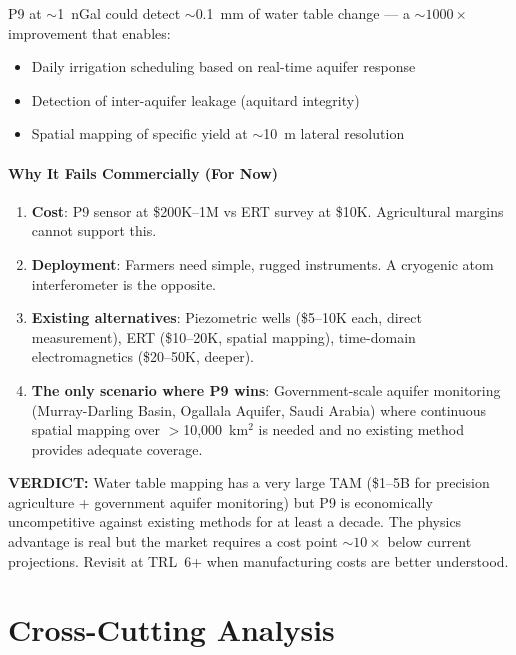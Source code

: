 \documentclass[11pt]{article}
\theoremstyle{definition}
\theoremstyle{remark}
\newcommand{\verdict}[1]{\textcolor{green!50!black}{\textbf{VERDICT:} #1}}
\begin{document}
P9 at $\sim$1~nGal could detect $\sim$0.1~mm of water table change
--- a $\sim 1000\times$ improvement that enables:
\begin{itemize}
  \item Daily irrigation scheduling based on real-time aquifer response
  \item Detection of inter-aquifer leakage (aquitard integrity)
  \item Spatial mapping of specific yield at $\sim$10~m lateral resolution
\end{itemize}

\subsection{Why It Fails Commercially (For Now)}

\begin{enumerate}
  \item \textbf{Cost}: P9 sensor at \$200K--1M vs ERT survey at \$10K.
    Agricultural margins cannot support this.
  \item \textbf{Deployment}: Farmers need simple, rugged instruments.
    A cryogenic atom interferometer is the opposite.
  \item \textbf{Existing alternatives}: Piezometric wells (\$5--10K
    each, direct measurement), ERT (\$10--20K, spatial mapping),
    time-domain electromagnetics (\$20--50K, deeper).
  \item \textbf{The only scenario where P9 wins}: Government-scale
    aquifer monitoring (Murray-Darling Basin, Ogallala Aquifer,
    Saudi Arabia) where continuous spatial mapping over
    $>$10,000~km$^2$ is needed and no existing method provides
    adequate coverage.
\end{enumerate}

\verdict{Water table mapping has a very large TAM (\$1--5B for
precision agriculture + government aquifer monitoring) but P9
is economically uncompetitive against existing methods for at least
a decade. The physics advantage is real but the market requires
a cost point $\sim$$10\times$ below current projections. Revisit at
TRL~6+ when manufacturing costs are better understood.}

\part{Cross-Cutting Analysis}
\label{part:cross}
\end{document}
